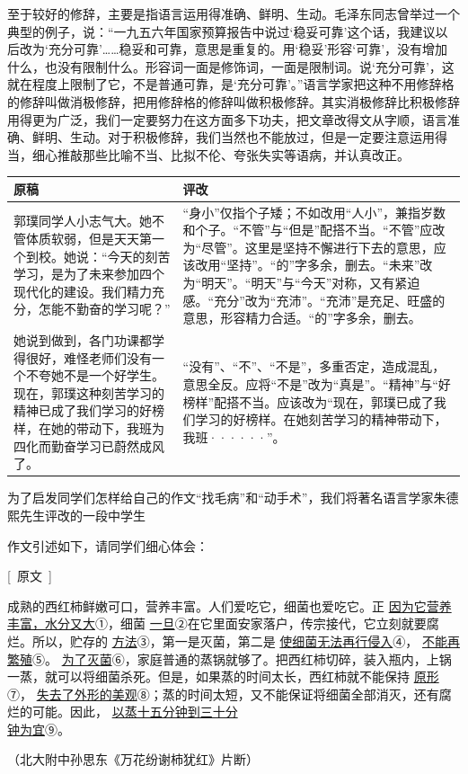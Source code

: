 至于较好的修辞，主要是指语言运用得准确、鲜明、生动。毛泽东同志曾举过一个典型的例子，说：“一九五六年国家预算报告中说过‘稳妥可靠’这个话，我建议以后改为‘充分可靠’……稳妥和可靠，意思是重复的。用‘稳妥’形容‘可靠’，没有增加什么，也没有限制什么。形容词一面是修饰词，一面是限制词。说‘充分可靠’，这就在程度上限制了它，不是普通可靠，是‘充分可靠’。”语言学家把这种不用修辞格的修辞叫做消极修辞，把用修辞格的修辞叫做积极修辞。其实消极修辞比积极修辞用得更为广泛，我们一定要努力在这方面多下功夫，把文章改得文从字顺，语言准确、鲜明、生动。对于积极修辞，我们当然也不能放过，但是一定要注意运用得当，细心推敲那些比喻不当、比拟不伦、夸张失实等语病，并认真改正。

\noindent
\begin{tabular}{|p{12em}|p{12em}|}
	\hline
	原稿 & 评改 \\ \hline
	郭璞同学人小志气大。她不管体质软弱，但是天天第一个到校。她说：“今天的刻苦学习，是为了未来参加四个现代化的建设。我们精力充分，怎能不勤奋的学习呢？” & “身小”仅指个子矮；不如改用“人小”，兼指岁数和个子。“不管”与“但是”配搭不当。“不管”应改为“尽管”。这里是坚持不懈进行下去的意思，应该改用“坚持”。“的”字多余，删去。“未来”改为“明天”。“明天”与“今天”对称，又有紧迫感。“充分”改为“充沛”。“充沛”是充足、旺盛的意思，形容精力合适。“的”字多余，删去。\\ \hline
	她说到做到，各门功课都学得很好，难怪老师们没有一个不夸她不是一个好学生。现在，郭璞这种刻苦学习的精神已成了我们学习的好榜样，在她的带动下，我班为四化而勤奋学习已蔚然成风了。 & “没有”、“不”、“不是”，多重否定，造成混乱，意思全反。应将“不是”改为“真是”。“精神”与“好榜样”配搭不当。应该改为“现在，郭璞已成了我们学习的好榜样。在她刻苦学习的精神带动下，我班······”。 \\ \hline
\end{tabular}
\vspace{1em}

为了启发同学们怎样给自己的作文“找毛病”和“动手术”，我们将著名语言学家朱德熙先生评改的一段中学生

作文引述如下，请同学们细心体会：

[\ 原文\ ]

成熟的西红柿鲜嫩可口，营养丰富。人们爱吃它，细菌也爱吃它。正
\uline{因为它营养丰富，水分又大}①，细菌
\uline{一旦}②在它里面安家落户，传宗接代，它立刻就要腐烂。所以，贮存的
\uline{方法}③，第一是灭菌，第二是
\uline{使细菌无法再行侵入}④，
\uline{不能再繁殖}⑤。
\uline{为了灭菌}⑥，家庭普通的蒸锅就够了。把西红柿切碎，装入瓶内，上锅一蒸，就可以将细菌杀死。但是，如果蒸的时间太长，西红柿就不能保持
\uline{原形}⑦，
\uline{失去了外形的美观}⑧；蒸的时间太短，又不能保证将细菌全部消灭，还有腐烂的可能。因此，
\uline{以蒸十五分钟到三十分\\ 钟为宜}⑨。
\begin{flushright}
	（北大附中孙思东《万花纷谢柿犹红》片断）
\end{flushright}


